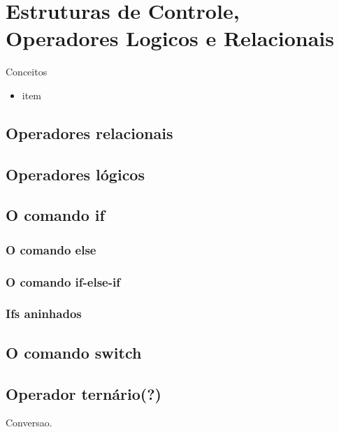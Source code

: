 
\chapter{Estruturas de Controle, Operadores Logicos e Relacionais}
Conceitos

\begin{itemize}
  \item item
\end{itemize}

\section{Operadores relacionais}
\section{Operadores lógicos}

\section{O comando if}
\subsection{O comando else}
\subsection{O comando if-else-if}
\subsection{Ifs aninhados}

\section{O comando switch}

\section{Operador ternário(?)}
Conversao.




